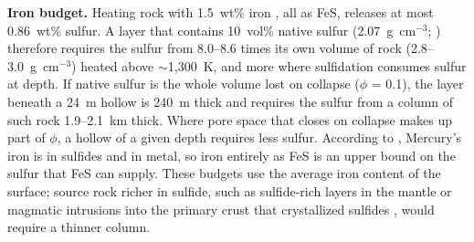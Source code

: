 \documentclass{planetary}
\begin{document}
\textbf{Iron budget.} Heating rock with 1.5~wt\% iron \parencite{weider2014}, all as FeS, releases at most 0.86~wt\% sulfur. A layer that contains 10~vol\% native sulfur (2.07~g~cm$^{-3}$; \cite{lide2007}) therefore requires the sulfur from 8.0--8.6 times its own volume of rock (2.8--3.0~g~cm$^{-3}$) heated above $\sim$1,300~K, and more where sulfidation consumes sulfur at depth. If native sulfur is the whole volume lost on collapse ($\phi$ = 0.1), the layer beneath a 24~m hollow is 240~m thick and requires the sulfur from a column of such rock 1.9--2.1~km thick. Where pore space that closes on collapse makes up part of $\phi$, a hollow of a given depth requires less sulfur. According to \textcite{weider2014}, Mercury's iron is in sulfides and in metal, so iron entirely as FeS is an upper bound on the sulfur that FeS can supply. These budgets use the average iron content of the surface; source rock richer in sulfide, such as sulfide-rich layers in the mantle \parencite{boukare2019} or magmatic intrusions into the primary crust that crystallized sulfides \parencite{namur2016}, would require a thinner column.
\end{document}
